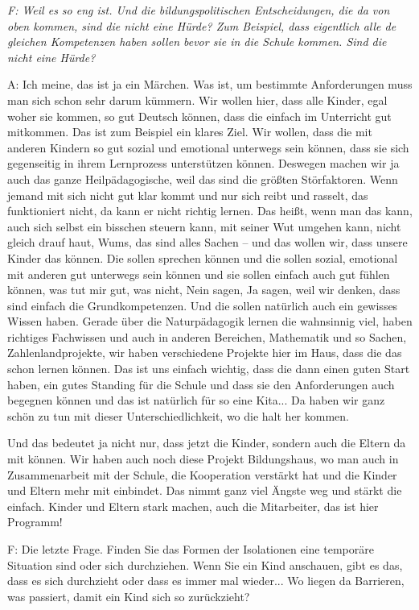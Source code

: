 \begin{linenumbers*}
\emph{F: Weil es so eng ist.
Und die bildungspolitischen Entscheidungen, die da von oben kommen, sind die nicht eine Hürde? Zum Beispiel, dass eigentlich alle de gleichen Kompetenzen haben sollen bevor sie in die Schule kommen. Sind die nicht eine Hürde?} 

A: Ich meine, das ist ja ein Märchen. Was ist, um bestimmte Anforderungen muss man sich schon sehr darum kümmern. Wir wollen hier, dass alle Kinder, egal woher sie kommen, so gut Deutsch können, dass die einfach im Unterricht gut mitkommen. Das ist zum Beispiel ein klares Ziel. Wir wollen, dass die mit anderen Kindern so gut sozial und emotional unterwegs sein können, dass sie sich gegenseitig in ihrem Lernprozess unterstützen können. Deswegen machen wir ja auch das ganze Heilpädagogische, weil das sind die größten Störfaktoren. Wenn jemand mit sich nicht gut klar kommt und nur sich reibt und rasselt, das funktioniert nicht, da kann er nicht richtig lernen. Das heißt, wenn man das kann, auch sich selbst ein bisschen steuern kann, mit seiner Wut umgehen kann, nicht gleich drauf haut, Wums, das sind alles Sachen -- und das wollen wir, dass unsere Kinder das können. Die sollen sprechen können und die sollen sozial, emotional mit anderen gut unterwegs sein können und sie sollen einfach auch gut fühlen können, was tut mir gut, was nicht, Nein sagen, Ja sagen, weil wir denken, dass sind einfach die Grundkompetenzen. 
Und die sollen natürlich auch ein gewisses Wissen haben. Gerade über die Naturpädagogik lernen die wahnsinnig viel, haben richtiges Fachwissen und auch in anderen Bereichen, Mathematik und so Sachen, Zahlenlandprojekte, wir haben verschiedene Projekte hier im Haus, dass die das schon lernen können. Das ist uns einfach wichtig, dass die dann einen guten Start haben, ein gutes Standing für die Schule und dass sie den Anforderungen auch begegnen können und das ist natürlich für so eine Kita... Da haben wir ganz schön zu tun mit dieser Unterschiedlichkeit, wo die halt her kommen. 

Und das bedeutet ja nicht nur, dass jetzt die Kinder, sondern auch die Eltern da mit können. Wir haben auch noch diese Projekt Bildungshaus, wo man auch in Zusammenarbeit mit der Schule, die Kooperation verstärkt hat und die Kinder und Eltern mehr mit einbindet. Das nimmt ganz viel Ängste weg und stärkt die einfach. Kinder und Eltern stark machen, auch die Mitarbeiter, das ist hier Programm!

F: Die letzte Frage. Finden Sie das Formen der Isolationen eine temporäre Situation sind oder sich durchziehen. Wenn Sie ein Kind anschauen, gibt es das, dass es sich durchzieht oder dass es immer mal wieder... Wo liegen da Barrieren, was passiert, damit ein Kind sich so zurückzieht? 


\end{linenumbers*}
